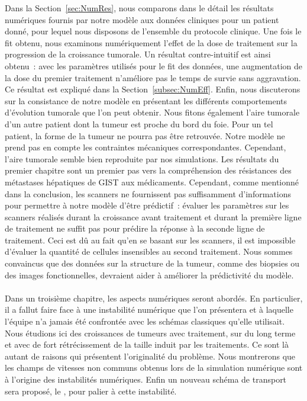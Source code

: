 \documentclass[main.tex]{subfiles}
\begin{document}
Dans la Section~\ref{sec:NumRes}, nous comparons dans le détail les résultats numériques fournis par notre modèle aux données cliniques pour un patient donné, pour lequel nous disposons de l'ensemble du protocole clinique. 
Une fois le fit obtenu, nous examinons numériquement l'effet de la dose de traitement sur la progression de la croissance tumorale. Un résultat contre-intuitif est ainsi obtenu~: avec les paramètres utilisés pour le fit des données, une augmentation de la dose du premier traitement n'améliore pas le temps de survie sans aggravation. Ce résultat est expliqué dans la Section~\ref{subsec:NumEff}. 
Enfin, nous discuterons sur la consistance de notre modèle en présentant les différents comportements d'évolution tumorale que l'on peut obtenir. 
Nous fitons également l'aire tumorale d'un autre patient dont la tumeur est proche du bord du foie. 
Pour un tel patient, la forme de la tumeur ne pourra pas être retrouvée. Notre modèle ne prend pas en compte les contraintes mécaniques correspondantes. Cependant, l'aire tumorale semble bien reproduite par nos simulations. 
Les résultats du premier chapitre sont un premier pas vers la compréhension des résistances des métastases hépatiques de GIST aux médicaments. Cependant, comme mentionné dans la conclusion, les scanners ne fournissent pas suffisamment d'informations pour permettre à notre modèle d'être prédictif~: évaluer les paramètres sur les scanners réalisés durant la croissance avant traitement et durant la première ligne de traitement ne suffit pas pour prédire la réponse à la seconde ligne de traitement. Ceci est dû au fait qu'en se basant sur les scanners, il est impossible d'évaluer la quantité de cellules insensibles au second traitement. Nous sommes convaincus que des données sur la structure de la tumeur, comme des biopsies ou des images fonctionnelles, devraient aider à améliorer la prédictivité du modèle.


\paragraph{}
Dans un troisième chapitre, les aspects numériques seront abordés. En particulier, il a fallut faire face à une instabilité numérique que l'on présentera et à laquelle l'équipe n'a jamais été confrontée avec les schémas classiques qu'elle utilisait. Nous étudions ici des croissances de tumeurs avec traitement, sur du long terme et avec de fort rétrécissement de la taille induit par les traitements. Ce sont là autant de raisons qui présentent l'originalité du problème. Nous montrerons que les champs de vitesses non communs obtenus lors de la simulation numérique  sont à l'origine des instabilités numériques. Enfin un nouveau schéma de transport sera proposé, le \twinweno, pour palier à cette instabilité.
\end{document}
